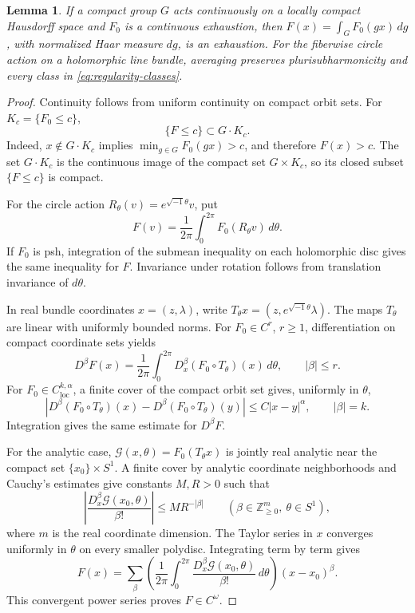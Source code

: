 \documentclass[11pt]{amsart}
\newtheorem{lemma}[theorem]{Lemma}
\theoremstyle{definition}
\theoremstyle{remark}
\numberwithin{equation}{section}
\begin{document}
\begin{lemma}\label{lem:average}
If a compact group $G$ acts continuously on a locally compact
Hausdorff space and $F_0$ is a continuous exhaustion, then
$F(x)=\int_GF_0(gx)\,dg$, with normalized Haar measure $dg$, is
an exhaustion. For the fiberwise circle
action on a holomorphic line bundle, averaging preserves
plurisubharmonicity and every class in \eqref{eq:regularity-classes}.
\end{lemma}
\begin{proof}
Continuity follows from uniform continuity on compact orbit sets.
For $K_c=\{F_0\le c\}$,
\[
 \{F\le c\}\subset G\cdot K_c.
\]
Indeed, $x\notin G\cdot K_c$ implies
$\min_{g\in G}F_0(gx)>c$, and therefore $F(x)>c$.
The set $G\cdot K_c$ is the continuous image of the compact set
$G\times K_c$, so its closed subset $\{F\le c\}$ is compact.

For the circle action $R_\theta(v)=e^{\sqrt{-1}\theta}v$, put
\begin{equation}\label{eq:circle-average}
 F(v)=\frac1{2\pi}\int_0^{2\pi}F_0(R_\theta v)\,d\theta.
\end{equation}
If $F_0$ is psh, integration of the submean inequality on each
holomorphic disc gives the same inequality for $F$. Invariance
under rotation follows from translation invariance of $d\theta$.

In real bundle coordinates $x=(z,\lambda)$, write
$T_\theta x=(z,e^{\sqrt{-1}\theta}\lambda)$. The maps $T_\theta$ are linear
with uniformly bounded norms. For $F_0\in C^r$, $r\ge1$,
differentiation on compact coordinate sets yields
\[
 D^\beta F(x)=\frac1{2\pi}\int_0^{2\pi}
 D_x^\beta(F_0\circ T_\theta)(x)\,d\theta,
 \qquad |\beta|\le r.
\]
For $F_0\in C^{k,\alpha}_{\mathrm{loc}}$, a finite cover of the
compact orbit set gives, uniformly in $\theta$,
\[
 |D^\beta(F_0\circ T_\theta)(x)
   -D^\beta(F_0\circ T_\theta)(y)|
 \le C|x-y|^\alpha,\qquad |\beta|=k.
\]
Integration gives the same estimate for $D^\beta F$.

For the analytic case, $\mathcal G(x,\theta)=F_0(T_\theta x)$ is
jointly real analytic near the compact set $\{x_0\}\times S^1$.
A finite cover by analytic coordinate neighborhoods and Cauchy's
estimates give constants $M,R>0$ such that
\begin{equation}\label{eq:analytic-average-estimate}
 \left|\frac{D_x^\beta\mathcal G(x_0,\theta)}{\beta!}\right|
 \le MR^{-|\beta|}
 \qquad(\beta\in\mathbb Z_{\ge0}^{m},\ \theta\in S^1),
\end{equation}
where $m$ is the real coordinate dimension. The Taylor series in $x$
converges uniformly in $\theta$ on every smaller polydisc. Integrating
term by term gives
\[
 F(x)=\sum_\beta\left(\frac1{2\pi}\int_0^{2\pi}
      \frac{D_x^\beta\mathcal G(x_0,\theta)}{\beta!}\,d\theta\right)
      (x-x_0)^\beta.
\]
This convergent power series proves $F\in C^\omega$.
\end{proof}
\end{document}
